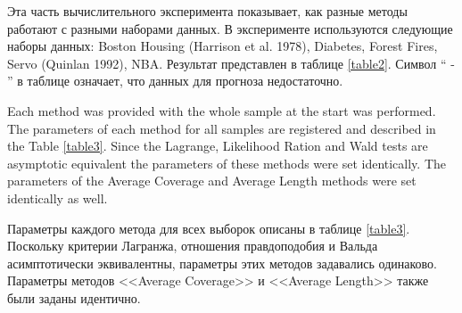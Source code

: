 Эта часть вычислительного эксперимента показывает, как разные методы работают с разными наборами данных. В эксперименте используются следующие наборы данных: Boston Housing (Harrison et al. 1978), Diabetes, Forest Fires, Servo (Quinlan 1992), NBA.
Результат представлен в таблице \ref{table2}. Символ `` - '' в таблице означает, что данных для прогноза недостаточно.

Each method was provided with the whole sample at the start was performed. The parameters of each method for all samples are registered and described in the Table \ref{table3}. Since the Lagrange, Likelihood Ration and Wald tests are asymptotic equivalent the parameters of these methods were set identically. The parameters of the Average Coverage and Average Length methods were set identically as well.

Параметры каждого метода для всех выборок описаны в таблице \ref{table3}. Поскольку критерии Лагранжа, отношения правдоподобия и Вальда асимптотически эквивалентны, параметры этих методов задавались одинаково. Параметры методов <<Average Coverage>> и <<Average Length>> также были заданы идентично.

\begin{table}[h!]
\begin{center}
\caption{Перечень параметров для разных методов оценки объема выборки}
\label{table3}
\end{center}
\end{table}

